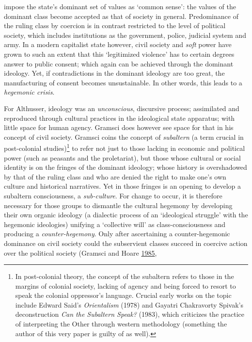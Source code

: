\documentclass[10pt,british,A4paper,oneside]{memoir}
\begin{document}
impose the state's dominant set of values as `common sense': the values
of the dominant class become accepted as that of society in general.
Predominance of the ruling class by coercion is in contrast restricted
to the level of political society, which includes institutions as the
government, police, judicial system and army. In a modern capitalist
state however, civil society and \emph{soft} power have grown to such an
extent that this `legitimized violence' has to certain degrees answer to
public consent; which again can be achieved through the dominant
ideology. Yet, if contradictions in the dominant ideology are too great,
the manufacturing of consent becomes unsustainable. In other words, this
leads to a \emph{hegemonic crisis}.

For Althusser, ideology was an \emph{unconscious}, discursive process;
assimilated and reproduced through cultural practices in the ideological
state apparatus; with little space for human agency. Gramsci does
however see space for that in his concept of civil society. Gramsci
coins the concept of \emph{subaltern} (a term crucial in post-colonial
studies)\footnote{In post-colonial theory, the concept of the subaltern
  refers to those in the margins of colonial society, lacking of agency
  and being forced to resort to speak the colonial oppressor's language.
  Crucial early works on the topic include Edward Said's
  \emph{Orientalism} (1978) and Gayatri Chakravorty Spivak's
  deconstruction \emph{Can the Subaltern Speak?} (1983), which
  criticizes the practice of interpreting the Other through western
  methodology (something the author of this very paper is guilty of as
  well).} to refer not just to those lacking in economic and political
power (such as peasants and the proletariat), but those whose cultural
or social identity is on the fringes of the dominant ideology; whose
history is overshadowed by that of the ruling class and who are denied
the right to make one's own culture and historical narratives. Yet in
those fringes is an opening to develop a subaltern consciousness, a
\emph{sub-culture}. For change to occur, it is therefore necessary for
those groups to dismantle the cultural hegemony by developing their own
organic ideology (a dialectic process of an `ideological struggle' with
the hegemonic ideologies) unifying a `collective will' as
class-consciousness and producing a \emph{counter-hegemony}. Only after
ascertaining a counter-hegemonic dominance on civil society could the
subservient classes succeed in coercive action over the political
society (Gramsci and Hoare
\protect\hyperlink{ref-gramsci_selections_1985}{1985},
\end{document}
